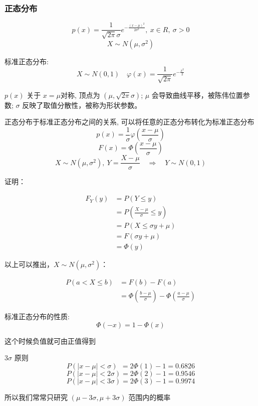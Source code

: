 \documentclass[10pt, a4paper]{article}
\begin{document}
        \subsubsection{正态分布}
        $$p(x) = \frac{1}{\sqrt{2\pi}\sigma}e^{-\frac{(x - \mu)^2}{2\sigma^2}},\ x \in R,\ \sigma > 0 $$
        $$X \sim N(\mu, \sigma^2)$$

        标准正态分布:
        $$X\sim N(0,1) \quad \varphi(x) = \frac{1}{\sqrt{2\pi}}e^{-\frac{x^2}{2}}$$

        $p(x)$ 关于 $x = \mu$对称, 顶点为 $(\mu, \sqrt{2\pi}\sigma)$; $\mu$ 会导致曲线平移，被陈伟位置参数; $\sigma$ 反映了取值分散性，被称为形状参数。
        
        正态分布于标准正态分布之间的关系, 可以将任意的正态分布转化为标准正态分布
        $$p(x) = \frac{1}{\sigma}\varphi(\frac{x - \mu}{\sigma})$$
        $$F(x) = \Phi(\frac{x - \mu}{\sigma})$$
        $$X \sim N(\mu, \sigma^2),\ Y = \frac{X - \mu}{\sigma} \quad \Rightarrow \quad Y \sim N(0, 1)$$

        证明：

        $$\begin{aligned} 
            F_Y(y)
            &= P(Y \leqslant y) \\
            &= P(\frac{X - \mu}{\sigma} \leqslant y) \\
            &= P(X \leqslant \sigma y + \mu) \\
            &= F(\sigma y + \mu) \\ 
            &= \Phi (y)
        \end{aligned} $$
        
        以上可以推出，$X \sim N(\mu, \sigma^2)$：

        $$\begin{aligned} 
            P(a < X \leqslant b) 
            &= F(b) - F(a) \\ 
            &= \Phi(\frac{b - \mu}{\sigma}) - \Phi(\frac{a - \mu}{\sigma})
        \end{aligned}$$

        标准正态分布的性质:
        $$\Phi(-x) = 1 - \Phi(x)$$
        
        这个时候负值就可由正值得到

        $3\sigma$ 原则
        $$P(|x - \mu| < \sigma)\ \ = 2\Phi(1) - 1 =  0.6826$$
        $$P(|x - \mu| < 2\sigma) = 2\Phi(2) - 1 = 0.9546$$
        $$P(|x - \mu| < 3\sigma) = 2\Phi(3) - 1 = 0.9974$$

        所以我们常常只研究 $(\mu - 3\sigma, \mu + 3\sigma)$ 范围内的概率
\end{document}
